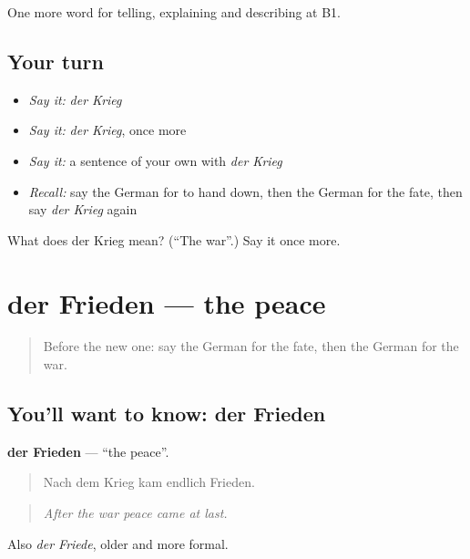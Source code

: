 \begin{grammarlens}[title={What you've built}]
One more word for telling, explaining and describing at B1.
\end{grammarlens}

\subsection*{Your turn}
\begin{itemize}
\raggedright
  \item \emph{Say it:} \emph{der Krieg}
  \item \emph{Say it:} \emph{der Krieg}, once more
  \item \emph{Say it:} a sentence of your own with \emph{der Krieg}
  \item \emph{Recall:} say the German for to hand down, then the German for the fate, then say \emph{der Krieg} again
\end{itemize}

\begin{tcolorbox}[breakable,colback=teal!4,colframe=teal!35!black,title={Before you move on}]
What does der Krieg mean? (\textquotedblleft{}The war\textquotedblright{}.) Say it once more.
\end{tcolorbox}
\section[der Frieden]{der Frieden — the peace}

\label{lesson:GE-C318-frieden}



\begin{quote}
Before the new one: say the German for the fate, then the German for the war.
\end{quote}

\subsection*{You'll want to know: der Frieden}
\textbf{der Frieden} — \textquotedblleft{}the peace\textquotedblright{}.

\begin{quote}
Nach dem Krieg kam endlich Frieden.
\end{quote}

\begin{quote}
\emph{After the war peace came at last.}
\end{quote}

Also \emph{der Friede}, older and more formal.

